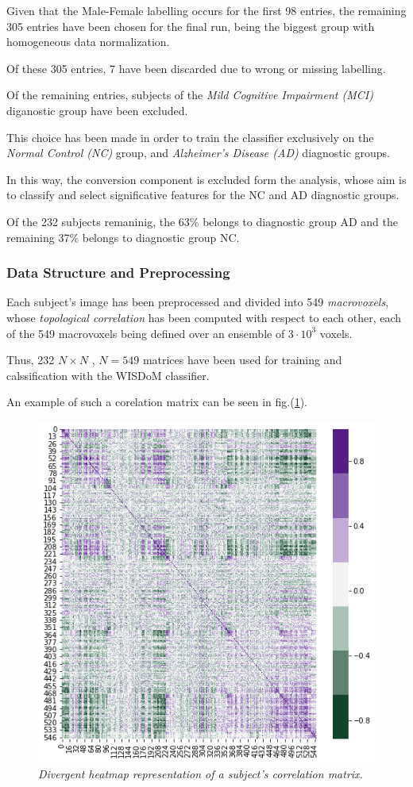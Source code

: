 \documentclass[12pt,openright,twoside,a4paper]{book}
\begin{document}
Given that the Male-Female labelling occurs for the first 98 entries, the remaining 305 entries have been chosen for the final run, being the biggest group with homogeneous data normalization.

Of these 305 entries, 7 have been discarded due to wrong or missing labelling.

Of the remaining entries, subjects of the \textit{Mild Cognitive Impairment (MCI)} diganostic group have been excluded.

This choice has been made in order to train the classifier exclusively on the \textit{Normal Control (NC)} group, and \textit{Alzheimer's Disease (AD)} diagnostic groups.

In this way, the conversion component is excluded form the analysis, whose aim is to classify and select significative features for the NC and AD diagnostic groups.

Of the 232 subjects remaninig, the 63\% belongs to diagnostic group AD and the remaining 37\% belongs to diagnostic group NC.

\subsubsection*{Data Structure and Preprocessing}

Each subject's image has been preprocessed and divided into 549 \textit{macrovoxels}, whose \textit{topological correlation} has been computed with respect to each other, each of the 549 macrovoxels being defined over an ensemble of $3 \cdot 10^3$ voxels.

Thus, 232 $N\times N$ , $N=549$ matrices have been used for training and calssification with the WISDoM classifier.

An example of such a corelation matrix can be seen in fig.(\ref{sample-heat}).

\begin{figure}[!h]
\centering
\includegraphics[scale=0.5]{sample-heat}
\caption{\textit{Divergent heatmap representation of a subject's correlation matrix.}}
\label{sample-heat}
\end{figure}
\end{document}
